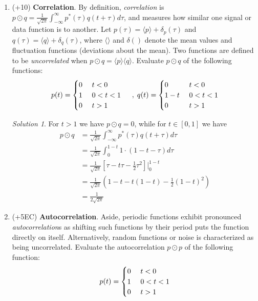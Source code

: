 \documentclass[10pt]{article}
\theoremstyle{definition}
\theoremstyle{remark}
\newtheorem*{solution}{Solution}
\begin{document}
\begin{enumerate}
    \item (+10) \textbf{Correlation}. By definition, \textit{correlation} is $p\odot q = \frac{1}{\sqrt{2\pi}} \int_{-\infty}^{\infty} p^* (\tau) q(t+\tau) d\tau$, and measures how similar one signal or data function is to another. Let $p(\tau)=\langle p \rangle +\delta_p(\tau)$ and $q(\tau)=\langle q \rangle +\delta_q(\tau)$, where $\langle \rangle$ and $\delta()$ denote the mean values and fluctuation functions (deviations about the mean). Two functions are defined to be \textit{uncorrelated} when $p\odot q = \langle p \rangle \langle q \rangle$. Evaluate $p\odot q$ of the following functions:
    \begin{equation*}
    p(t) = \begin{cases}
    0 & \mbox{ $ t<0 $}\\
    1 & \mbox{ $ 0 < t < 1 $}\\
    0 & \mbox{ $ t > 1 $}
    \end{cases} \quad \; , \;
    q(t) = \begin{cases}
    0 & \mbox{ $ t<0 $}\\
    1-t & \mbox{ $ 0 < t < 1 $}\\
    0 & \mbox{ $ t > 1 $}
    \end{cases}
    \end{equation*}
    \begin{solution}
        For $t >1$ we have $p \odot q = 0$, while for $t \in [0,1]$ we have \begin{align*}
            p \odot q &= \frac{1}{\sqrt{2\pi}} \int_{-\infty}^\infty p^*(\tau)q(t+\tau) d\tau \\
            &= \frac{1}{\sqrt{2\pi}} \int_{0}^{1-t} 1 \cdot (1-t-\tau) d\tau \\
            &= \frac{1}{\sqrt{2\pi}} \left[ \tau - t \tau - \frac{1}{2} \tau^2 \right] \Bigg|_0^{1-t} \\
            &= \frac{1}{\sqrt{2\pi}} \left( 1-t - t(1-t) - \frac{1}{2}(1-t)^2 \right) \\
            &= \frac{1}{2 \sqrt{2 \pi}}
        \end{align*}
    \end{solution}

    \item (+5EC) \textbf{Autocorrelation}. Aside, periodic functions exhibit pronounced \textit{autocorrelation}s as shifting such functions by their period puts the function directly on itself. Alternatively, random functions or noise is characterized as being uncorrelated. Evaluate the autocorrelation $p\odot p$ of the following function:
    \[ p(t) = \begin{cases}
    0 & \mbox{ $ t<0 $}\\
    1 & \mbox{ $ 0 < t < 1 $}\\
    0 & \mbox{ $ t > 1 $}
    \end{cases}
    \]


\end{enumerate}
\end{document}
